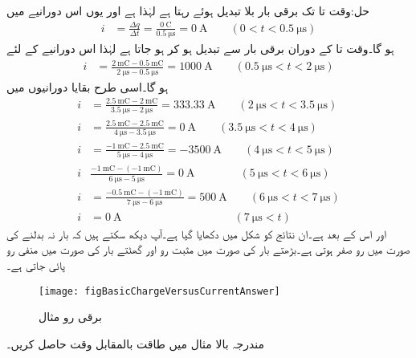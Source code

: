 حل:وقت  تا  تک برقی بار بلا تبدیل ہوئے  رہتا ہے لہٰذا   ہے اور یوں اس دورانیے میں
\begin{align*}
i&=\frac{\Delta q}{\Delta t}=\frac{\SI{0}{\coulomb}}{\SI{0.5}{\micro\second}}=\SI{0}{\ampere} \quad \quad (0<t<\SI{0.5}{\micro\second})
\end{align*} 
ہو گا۔وقت  تا  کے دوران برقی بار  سے تبدیل ہو کر  ہو جاتا ہے لہٰذا اس دورانیے کے لئے
\begin{align*}
i&=\frac{\SI{2}{\milli\coulomb}-\SI{0.5}{\milli \coulomb}}{\SI{2}{\micro\second}-\SI{0.5}{\micro\second}}=\SI{1000}{\ampere}\quad \quad (\SI{0.5}{\micro\second}<t<\SI{2}{\micro\second})
\end{align*} 
ہو گا۔اسی طرح بقایا دورانیوں میں
\begin{align*}
i&=\frac{\SI{2.5}{\milli\coulomb}-\SI{2}{\milli \coulomb}}{\SI{3.5}{\micro\second}-\SI{2}{\micro\second}}=\SI{333.33}{\ampere}\quad \quad (\SI{2}{\micro\second}<t<\SI{3.5}{\micro\second})\\
i&=\frac{\SI{2.5}{\milli\coulomb}-\SI{2.5}{\milli \coulomb}}{\SI{4}{\micro\second}-\SI{3.5}{\micro\second}}=\SI{0}{\ampere}\quad \quad (\SI{3.5}{\micro\second}<t<\SI{4}{\micro\second})\\
i&=\frac{\SI{-1}{\milli\coulomb}-\SI{2.5}{\milli \coulomb}}{\SI{5}{\micro\second}-\SI{4}{\micro\second}}=\SI{-3500}{\ampere}\quad \quad (\SI{4}{\micro\second}<t<\SI{5}{\micro\second})\\
i&\frac{\SI{-1}{\milli\coulomb}-(\SI{-1}{\milli\coulomb})}{\SI{6}{\micro\second}-\SI{5}{\micro\second}}=\SI{0}{\ampere}\quad \quad\quad \quad (\SI{5}{\micro\second}<t<\SI{6}{\micro\second})\\
i&=\frac{\SI{-0.5}{\milli\coulomb}-(\SI{-1}{\milli \coulomb})}{\SI{7}{\micro\second}-\SI{6}{\micro\second}}=\SI{500}{\ampere}\quad \quad (\SI{6}{\micro\second}<t<\SI{7}{\micro\second})\\
i&=\SI{0}{\ampere}\quad \quad\quad \quad\quad \quad\quad \quad\quad \quad (\SI{7}{\micro\second}<t)
\end{align*} 
اور اس کے بعد  ہے۔ان نتائج کو شکل  میں دکھایا گیا ہے۔آپ دیکھ سکتے ہیں کہ بار نہ بدلنے کی صورت میں رو صفر ہوتی ہے۔بڑھتے بار کی صورت میں مثبت رو اور گھٹتے بار کی صورت میں منفی رو پائی جاتی ہے۔

\begin{figure}
\centering
\texttt{[image: figBasicChargeVersusCurrentAnswer]}
\caption{برقی رو مثال }
\label{شکل_بنیادی_برقی_رو_مثال}
\end{figure}
مندرجہ بالا مثال میں طاقت بالمقابل وقت حاصل کریں۔

